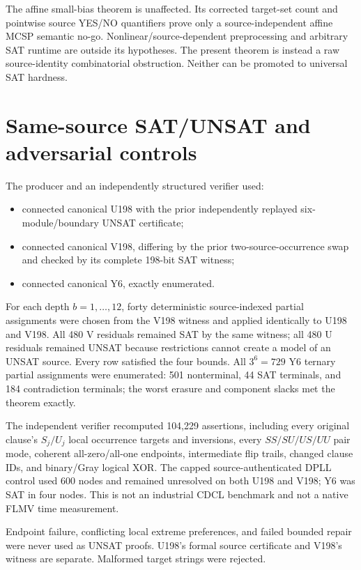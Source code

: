 \documentclass[11pt]{article}
\begin{document}
The affine small-bias theorem is unaffected.  Its corrected target-set count and pointwise source YES/NO quantifiers prove only a source-independent affine MCSP semantic no-go.  Nonlinear/source-dependent preprocessing and arbitrary SAT runtime are outside its hypotheses.  The present theorem is instead a raw source-identity combinatorial obstruction.  Neither can be promoted to universal SAT hardness.

\section{Same-source SAT/UNSAT and adversarial controls}
The producer and an independently structured verifier used:
\begin{itemize}
\item connected canonical U198 with the prior independently replayed six-module/boundary UNSAT certificate;
\item connected canonical V198, differing by the prior two-source-occurrence swap and checked by its complete 198-bit SAT witness;
\item connected canonical Y6, exactly enumerated.
\end{itemize}
For each depth $b=1,\ldots,12$, forty deterministic source-indexed partial assignments were chosen from the V198 witness and applied identically to U198 and V198.  All 480 V residuals remained SAT by the same witness; all 480 U residuals remained UNSAT because restrictions cannot create a model of an UNSAT source.  Every row satisfied the four bounds.  All $3^6=729$ Y6 ternary partial assignments were enumerated: 501 nonterminal, 44 SAT terminals, and 184 contradiction terminals; the worst erasure and component slacks met the theorem exactly.

The independent verifier recomputed 104,229 assertions, including every original clause's $S_j/U_j$ local occurrence targets and inversions, every $SS/SU/US/UU$ pair mode, coherent all-zero/all-one endpoints, intermediate flip trails, changed clause IDs, and binary/Gray logical XOR.  The capped source-authenticated DPLL control used 600 nodes and remained unresolved on both U198 and V198; Y6 was SAT in four nodes.  This is not an industrial CDCL benchmark and not a native FLMV time measurement.

Endpoint failure, conflicting local extreme preferences, and failed bounded repair were never used as UNSAT proofs.  U198's formal source certificate and V198's witness are separate.  Malformed target strings were rejected.
\end{document}
